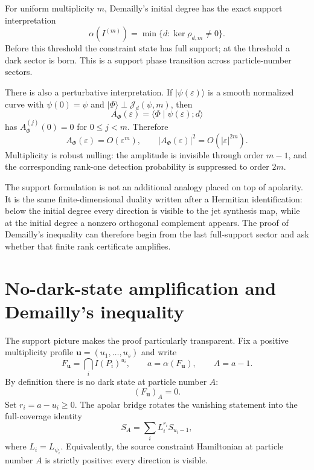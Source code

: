 \documentclass[11pt]{article}
\theoremstyle{remark}
\newcommand{\cJ}{\mathcal J}
\newcommand{\ket}[1]{\lvert #1\rangle}
\newcommand{\braket}[2]{\langle #1\mid #2\rangle}
\begin{document}
For uniform multiplicity $m$, Demailly's initial degree has the exact support interpretation
\begin{equation}
  \alpha(I^{(m)})
  =\min\{d:\ker\rho_{d,m}\ne0\}.
  \label{eq:supportthreshold}
\end{equation}
Before this threshold the constraint state has full support; at the threshold a dark sector is born.  This is a support phase transition across particle-number sectors.

There is also a perturbative interpretation.  If $\ket{\psi(\varepsilon)}$ is a smooth normalized curve with $\psi(0)=\psi$ and $\ket\Phi\perp\cJ_d(\psi,m)$, then
\[
  A_\Phi(\varepsilon)=\braket{\Phi}{\psi(\varepsilon);d}
\]
has $A_\Phi^{(j)}(0)=0$ for $0\le j<m$.  Therefore
\[
  A_\Phi(\varepsilon)=O(\varepsilon^m),
  \qquad
  |A_\Phi(\varepsilon)|^2=O(|\varepsilon|^{2m}).
\]
Multiplicity is robust nulling: the amplitude is invisible through order $m-1$, and the corresponding rank-one detection probability is suppressed to order $2m$.



The support formulation is not an additional analogy placed on top of apolarity.  It is the same finite-dimensional duality written after a Hermitian identification: below the initial degree every direction is visible to the jet synthesis map, while at the initial degree a nonzero orthogonal complement appears.  The proof of Demailly's inequality can therefore begin from the last full-support sector and ask whether that finite rank certificate amplifies.

\section{No-dark-state amplification and Demailly's inequality}

The support picture makes the proof particularly transparent.  Fix a positive multiplicity profile $\mathbf u=(u_1,\ldots,u_s)$ and write
\[
  F_{\mathbf u}=\bigcap_iI(P_i)^{u_i},
  \qquad
  a=\alpha(F_{\mathbf u}),
  \qquad
  A=a-1.
\]
By definition there is no dark state at particle number $A$:
\[
  (F_{\mathbf u})_A=0.
\]
Set $r_i=a-u_i\ge0$.  The apolar bridge rotates the vanishing statement into the full-coverage identity
\begin{equation}
  S_A=\sum_i L_i^{r_i}S_{u_i-1},
  \label{eq:sourcecoverage}
\end{equation}
where $L_i=L_{\psi_i}$.  Equivalently, the source constraint Hamiltonian at particle number $A$ is strictly positive: every direction is visible.
\end{document}
